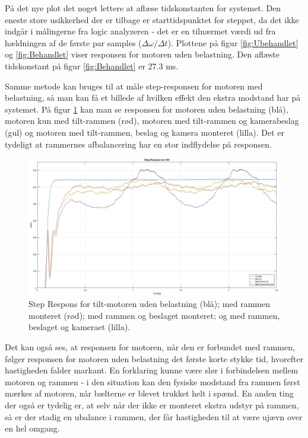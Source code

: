 På det nye plot det noget lettere at aflæse tidskonstanten for systemet. Den eneste store usikkerhed der er tilbage er starttidspunktet for steppet, da det ikke indgår i målingerne fra logic analyzeren - det er en tilnærmet værdi ud fra hældningen af de første par samples ($\Delta\omega/\Delta t$). Plottene på figur \ref{fig:Ubehandlet} og \ref{fig:Behandlet} viser responsen for motoren uden belastning. Den aflæste tidskonstant på figur \ref{fig:Behandlet} er 27.3 ms.

Samme metode kan bruges til at måle step-responsen for motoren med belastning, så man kan få et billede af hvilken effekt den ekstra modstand har på systemet. På figur \ref{fig:Combined} kan man se responsen for motoren uden belastning (blå), motoren kun med tilt-rammen (rød), motoren med tilt-rammen og kamerabeslag (gul) og motoren med tilt-rammen, beslag og kamera monteret (lilla). Det er tydeligt at rammernes afbalancering har en stor indflydelse på responsen.

\begin{figure}[!ht]
	\begin{center}
		\includegraphics[scale=0.35]{Billeder/Response_Combined.jpg}
	\end{center}
	\caption{Step Respons for tilt-motoren uden belastning (blå); med rammen monteret (rød); med rammen og beslaget monteret; og med rammen, beslaget og kameraet (lilla).}
	\label{fig:Combined}
\end{figure}

Det kan også ses, at responsen for motoren, når den er forbundet med rammen, følger responsen for motoren uden belastning det første korte stykke tid, hvorefter hastigheden falder markant. En forklaring kunne være slør i forbindelsen mellem motoren og rammen - i den situation kan den fysiske modstand fra rammen først mærkes af motoren, når bælterne er blevet trukket helt i spænd. En anden ting der også er tydelig er, at selv når der ikke er monteret ekstra udstyr på rammen, så er der stadig en ubalance i rammen, der får hastigheden til at være ujævn over en hel omgang.

